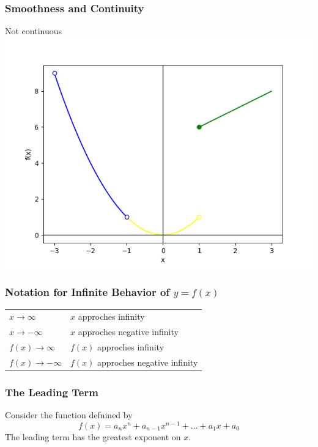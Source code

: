 \documentclass{beamer}
\begin{document}
\begin{frame}
    \frametitle{Smoothness and Continuity}

    Not continuous\\

    \includegraphics[scale=0.5]{figs/fig_4.png}

\end{frame}

\begin{frame}
    \frametitle{Notation for Infinite Behavior of \(y=f(x)\)}

    \begin{tabular}{ll}
        \(x \to \infty\) & \(x\) approches infinity\\ \pause 
        \(x \to - \infty\) & \(x\) approches negative infinity\\ \pause
        \(f(x) \to \infty\) & \(f(x)\) approches infinity \\ \pause
        \(f(x) \to - \infty\) & \(f(x)\) approches negative infinity \pause    
    \end{tabular}

\end{frame}

\begin{frame}
    \frametitle{The Leading Term}

     Consider the function defnined by \[f(x)= a_n x^n + a_{n-1}x^{n-1}+ \dots + a_1 x + a_0\]\pause 
     The leading term has the greatest exponent on \(x\).    

\end{frame}
\end{document}
